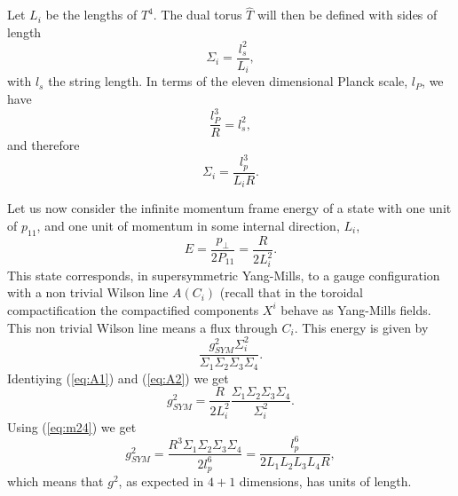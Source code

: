 Let $L_i$ be the lengths of $T^4$. The dual torus $\hat{T}$
will then be defined with sides of length
\begin{equation}
\Sigma_i = \frac {l_s^2}{L_i},
\label{eq:m22}
\end{equation}
with $l_s$ the string length. In terms of the eleven dimensional 
Planck scale, $l_P$, we have
\begin{equation}
\frac {l_P^3}{R} = l_s^2,
\label{eq:m23}
\end{equation}
and therefore
\begin{equation}
\Sigma_i = \frac {l_p^3}{L_i R}.
\label{eq:m24}
\end{equation}
  
Let us now consider the infinite momentum frame energy of a state
with one unit of $p_{11}$, and one unit of momentum in some
internal direction, $L_i$,
\begin{equation}
E = \frac {p_{\perp}}{2 P_{11}} = \frac {R}{2 L_i^2}.
\label{eq:A1}
\end{equation}
This state corresponds, in supersymmetric Yang-Mills, to a gauge
configuration with a non trivial Wilson line $A(C_i)$ (recall
that in the toroidal compactification the compactified components
$X^{i}$ behave as Yang-Mills fields. This non trivial Wilson line
means a flux through $C_i$. This energy is given by
\begin{equation}
\frac {g_{SYM}^2 \Sigma_i^2}{\Sigma_1 \Sigma_2 \Sigma_3
\Sigma_4}.
\label{eq:A2}
\end{equation}
Identiying (\ref{eq:A1}) and (\ref{eq:A2}) we get
\begin{equation}
g_{SYM}^2 = \frac {R}{2 L_i^2} \frac {\Sigma_ 1 \Sigma_2 \Sigma_3
\Sigma_4}{\Sigma_i^2}.
\label{eq:A3}
\end{equation}
Using (\ref{eq:m24}) we get
\begin{equation}
g_{SYM}^2 = \frac {R^3 \Sigma_1 \Sigma_2 \Sigma_3 \Sigma_4}{2
l_p^6} = \frac {l_p^6}{2 L_1 L_2 L_3 L_4 R},
\label{eq:A4}
\end{equation}
which means that $g^2$, as expected in $4+1$ dimensions, has
units of length.
  

